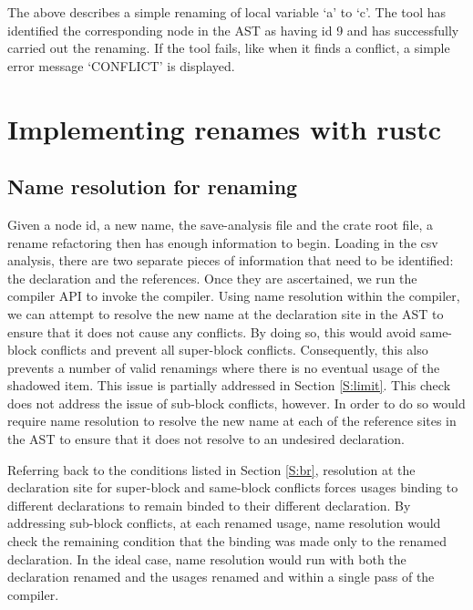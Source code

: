 The above describes a simple renaming of local variable `a' to `c'. The tool has identified the corresponding node in the AST as having id 9 and has successfully carried out the renaming. If the tool fails, like when it finds a conflict, a simple error message `CONFLICT' is displayed.


\section{Implementing renames with rustc}\label{S:building}
\subsection{Name resolution for renaming}
Given a node id, a new name, the save-analysis file and the crate root file, a rename refactoring then has enough information to begin. Loading in the csv analysis, there are two separate pieces of information that need to be identified: the declaration and the references. Once they are ascertained, we run the compiler API to invoke the compiler. Using name resolution within the compiler, we can attempt to resolve the new name at the declaration site in the AST to ensure that it does not cause any conflicts. By doing so, this would avoid same-block conflicts and prevent all super-block conflicts. Consequently, this also prevents a number of valid renamings where there is no eventual usage of the shadowed item. This issue is partially addressed in Section \ref{S:limit}. This check does not address the issue of sub-block conflicts, however. In order to do so would require name resolution to resolve the new name at each of the reference sites in the AST to ensure that it does not resolve to an undesired declaration. 

Referring back to the conditions listed in Section \ref{S:br}, resolution at the declaration site for super-block and same-block conflicts forces usages binding to different declarations to remain binded to their different declaration. By addressing sub-block conflicts, at each renamed usage, name resolution would check the remaining condition that the binding was made only to the renamed declaration. In the ideal case, name resolution would run with both the declaration renamed and the usages renamed and within a single pass of the compiler.


